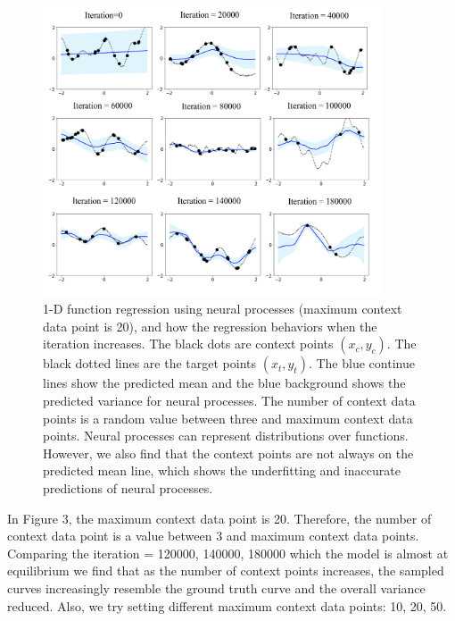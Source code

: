 \documentclass{article}
\begin{document}
\begin{figure}[h!]
  \centering
  \includegraphics[width = 10cm]{NPS_1D_regression.png}
  \caption{1-D function regression using neural processes (maximum context data point is 20), and how the regression behaviors when the iteration increases. The black dots are context points $(x_c, y_c)$. The black dotted lines are the target points $(x_t, y_t)$. The blue continue lines show the predicted mean and the blue background shows the predicted variance for neural processes. The number of context data points is a random value between three and maximum context data points. Neural processes can represent distributions over functions. However, we also find that the context points are not always on the predicted mean line, which shows the underfitting and inaccurate predictions of neural processes.}
\end{figure}

In Figure 3, the maximum context data point is 20. Therefore, the number of context data point is a value between 3 and maximum context data points. Comparing the iteration = 120000, 140000, 180000 which the model is almost at equilibrium we find that as the number of context points increases, the sampled curves increasingly resemble the ground truth curve and the overall variance reduced. Also, we try setting different maximum context data points: 10, 20, 50. 
\end{document}
